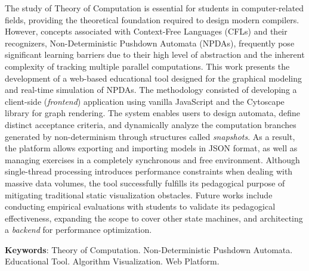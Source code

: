 \begin{resumo}[Abstract]
The study of Theory of Computation is essential for students in computer-related fields, providing the theoretical foundation required to design modern compilers. However, concepts associated with Context-Free Languages (CFLs) and their recognizers, Non-Deterministic Pushdown Automata (NPDAs), frequently pose significant learning barriers due to their high level of abstraction and the inherent complexity of tracking multiple parallel computations. This work presents the development of a web-based educational tool designed for the graphical modeling and real-time simulation of NPDAs. The methodology consisted of developing a client-side (\textit{frontend}) application using vanilla JavaScript and the Cytoscape library for graph rendering. The system enables users to design automata, define distinct acceptance criteria, and dynamically analyze the computation branches generated by non-determinism through structures called \textit{snapshots}. As a result, the platform allows exporting and importing models in JSON format, as well as managing exercises in a completely synchronous and free environment. Although single-thread processing introduces performance constraints when dealing with massive data volumes, the tool successfully fulfills its pedagogical purpose of mitigating traditional static visualization obstacles. Future works include conducting empirical evaluations with students to validate its pedagogical effectiveness, expanding the scope to cover other state machines, and architecting a \textit{backend} for performance optimization.

\textbf{Keywords}: Theory of Computation. Non-Deterministic Pushdown Automata. Educational Tool. Algorithm Visualization. Web Platform.
\end{resumo}